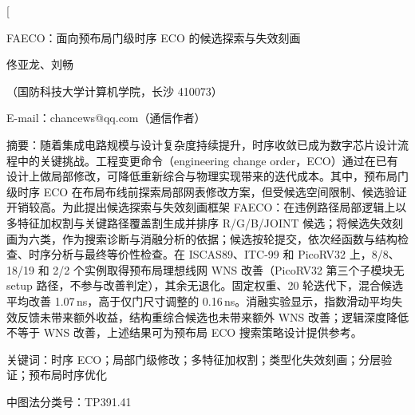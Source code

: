 \documentclass[twocolumn,10pt,fontset=windows]{ctexart}
\let\songti\songfamily\let\heiti\heifamily\let\fangsong\fangfamily
\begin{document}
\pagestyle{plain}

\twocolumn[
\vspace*{-0.25cm}
\begin{center}
{\heiti{} FAECO：面向预布局门级时序 ECO 的候选探索与失效刻画}\par
\vspace{6pt}
{\fangsong{} 佟亚龙、刘畅}\par
\vspace{4pt}
{\songti\fontsize{8}{12}\selectfont（国防科技大学计算机学院，长沙 410073）}\par\vspace{2pt}
{\songti\fontsize{8}{12}\selectfont E-mail：chancews@qq.com（通信作者）}\par
\vspace{6pt}
\end{center}
\begin{flushleft}
  {\heiti\fontsize{8.5}{13}\selectfont 摘\quad 要：}{\songti\fontsize{8.5}{13}\selectfont 随着集成电路规模与设计复杂度持续提升，时序收敛已成为数字芯片设计流程中的关键挑战。工程变更命令（engineering change order，ECO）通过在已有设计上做局部修改，可降低重新综合与物理实现带来的迭代成本。其中，预布局门级时序 ECO 在布局布线前探索局部网表修改方案，但受候选空间限制、候选验证开销较高。为此提出候选探索与失效刻画框架 FAECO：在违例路径局部逻辑上以多特征加权割与关键路径覆盖割生成并排序 R/G/B/JOINT 候选；将候选失效刻画为六类，作为搜索诊断与消融分析的依据；候选按轮提交，依次经函数与结构检查、时序分析与最终等价性检查。在 ISCAS89、ITC-99 和 PicoRV32 上，8/8、18/19 和 2/2 个实例取得预布局理想线网 WNS 改善（PicoRV32 第三个子模块无 setup 路径，不参与改善判定），其余无退化。固定权重、20 轮迭代下，混合候选平均改善 1.07\,ns，高于仅门尺寸调整的 0.16\,ns。消融实验显示，指数滑动平均失效反馈未带来额外收益，结构重综合候选也未带来额外 WNS 改善；逻辑深度降低不等于 WNS 改善，上述结果可为预布局 ECO 搜索策略设计提供参考。}
\par
\vspace{4pt}
{\heiti\fontsize{8.5}{13}\selectfont 关键词：}{\songti\fontsize{8.5}{13}\selectfont 时序 ECO；局部门级修改；多特征加权割；类型化失效刻画；分层验证；预布局时序优化}\par
\vspace{2pt}
{\songti\fontsize{8.5}{13}\selectfont 中图法分类号：TP391.41}\par
\vspace{3pt}
\end{flushleft}
\end{document}
